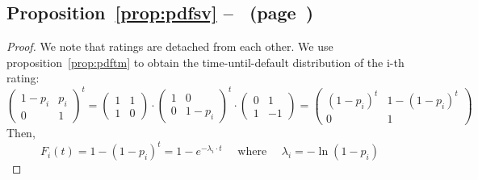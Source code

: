 \documentclass[11pt,fleqn]{book} %
\begin{document}
\subsection{Proposition~\ref{prop:pdfsv} --~ (page~\pageref{prop:pdfsv})}
\begin{proof}
	We note that ratings are detached from each other. We use 
	proposition~\ref{prop:pdftm} to obtain the time-until-default distribution 
	of the i-th rating:
	\small
	\begin{displaymath}
		\left(
		\begin{array}{cc}
			1-p_i & p_i \\
			0 & 1
		\end{array}
		\right) ^ t 
		= 
		\left(
		\begin{array}{cc}
			1 & 1 \\
			1 & 0
		\end{array}
		\right) 
		\cdot
		\left(
		\begin{array}{cc}
			1 & 0 \\
			0 & 1-p_i
		\end{array}
		\right) ^t 
		\cdot
		\left(
		\begin{array}{cc}
			0 & 1 \\
			1 & -1
		\end{array}
		\right)
		=
		\left(
		\begin{array}{cc}
			(1-p_i)^t & 1-(1-p_i)^t \\
			0 & 1
		\end{array}
		\right)
	\end{displaymath}
	Then,
	\begin{displaymath}
		F_i(t) = 1-(1-p_i)^t = 1 - e^{-\lambda_i \cdot t} \quad \text{ where } \quad \lambda_i = -\ln(1-p_i)
	\end{displaymath}
\end{proof}
\end{document}
